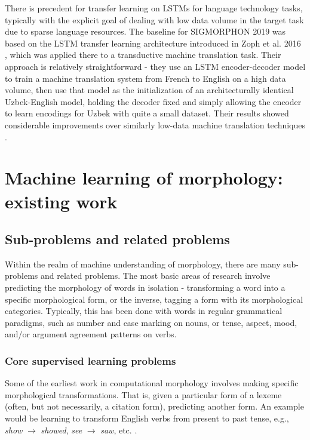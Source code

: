 There is precedent for transfer learning on LSTMs for language technology tasks, typically with the explicit goal of dealing with low data volume in the target task due to sparse language resources. The baseline for SIGMORPHON 2019 was based on the LSTM transfer learning architecture introduced in Zoph et al. 2016 \parencite{McCarthy2019}, which was applied there to a transductive machine translation task. Their approach is relatively straightforward - they use an LSTM encoder-decoder model to train a machine translation system from French to English on a high data volume, then use that model as the initialization of an architecturally identical Uzbek-English model, holding the decoder fixed and simply allowing the encoder to learn encodings for Uzbek with quite a small dataset. Their results showed considerable improvements over similarly low-data machine translation techniques \parencite{Zoph2016}.

\chapter{Machine learning of morphology: existing work}

\section{Sub-problems and related problems}

Within the realm of machine understanding of morphology, there are many sub-problems and related problems. The most basic areas of research involve predicting the morphology of words in isolation - transforming a word into a specific morphological form, or the inverse, tagging a form with its morphological categories. Typically, this has been done with words in regular grammatical paradigms, such as number and case marking on nouns, or tense, aspect, mood, and/or argument agreement patterns on verbs. 

\subsection{Core supervised learning problems}

Some of the earliest work in computational morphology involves making specific morphological transformations. That is, given a particular form of a lexeme (often, but not necessarily, a citation form), predicting another form. An example would be learning to transform English verbs from present to past tense, e.g., \textit{show} $\rightarrow$ \textit{showed}, \textit{see} $\rightarrow$ \textit{saw}, etc. \parencite{Dreyer2008}.


